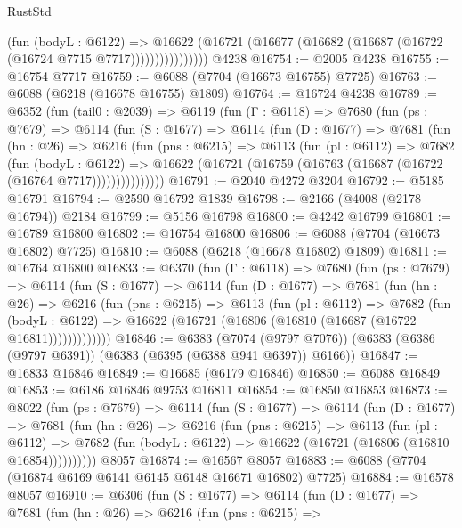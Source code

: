 \begin{lexlean}{RustStd}
\begin{coremodule}
                      (fun (bodyL : @6122) =>
                      @16622
                        (@16721 (@16677 (@16682 (@16687 (@16722 (@16724 @7715 @7717))))))))))))))))
    @4238
@16754 := @2005 @4238
@16755 := @16754 @7717
@16759 := @6088 (@7704 (@16673 @16755) @7725)
@16763 := @6088 (@6218 (@16678 @16755) @1809)
@16764 := @16724 @4238
@16789 := @6352
    (fun (tail0 : @2039) =>
    @6119
      (fun (Γ : @6118) =>
      @7680
        (fun (ps : @7679) =>
        @6114
          (fun (S : @1677) =>
          @6114
            (fun (D : @1677) =>
            @7681
              (fun (hn : @26) =>
              @6216
                (fun (pns : @6215) =>
                @6113
                  (fun (pl : @6112) =>
                  @7682
                    (fun (bodyL : @6122) =>
                    @16622 (@16721 (@16759 (@16763 (@16687 (@16722 (@16764 @7717)))))))))))))))
@16791 := @2040 @4272 @3204
@16792 := @5185 @16791
@16794 := @2590 @16792 @1839
@16798 := @2166 (@4008 (@2178 @16794)) @2184
@16799 := @5156 @16798
@16800 := @4242 @16799
@16801 := @16789 @16800
@16802 := @16754 @16800
@16806 := @6088 (@7704 (@16673 @16802) @7725)
@16810 := @6088 (@6218 (@16678 @16802) @1809)
@16811 := @16764 @16800
@16833 := @6370
    (fun (Γ : @6118) =>
    @7680
      (fun (ps : @7679) =>
      @6114
        (fun (S : @1677) =>
        @6114
          (fun (D : @1677) =>
          @7681
            (fun (hn : @26) =>
            @6216
              (fun (pns : @6215) =>
              @6113
                (fun (pl : @6112) =>
                @7682
                  (fun (bodyL : @6122) =>
                  @16622 (@16721 (@16806 (@16810 (@16687 (@16722 @16811)))))))))))))
@16846 := @6383
    (@7074 (@9797 @7076))
    (@6383 (@6386 (@9797 @6391)) (@6383 (@6395 (@6388 @941 @6397)) @6166))
@16847 := @16833 @16846
@16849 := @16685 (@6179 @16846)
@16850 := @6088 @16849
@16853 := @6186 @16846 @9753 @16811
@16854 := @16850 @16853
@16873 := @8022
    (fun (ps : @7679) =>
    @6114
      (fun (S : @1677) =>
      @6114
        (fun (D : @1677) =>
        @7681
          (fun (hn : @26) =>
          @6216
            (fun (pns : @6215) =>
            @6113
              (fun (pl : @6112) =>
              @7682 (fun (bodyL : @6122) => @16622 (@16721 (@16806 (@16810 @16854))))))))))
    @8057
@16874 := @16567 @8057
@16883 := @6088 (@7704 (@16874 @6169 @6141 @6145 @6148 @16671 @16802) @7725)
@16884 := @16578 @8057
@16910 := @6306
    (fun (S : @1677) =>
    @6114
      (fun (D : @1677) =>
      @7681
        (fun (hn : @26) =>
        @6216
          (fun (pns : @6215) =>

\end{coremodule}
\end{lexlean}
